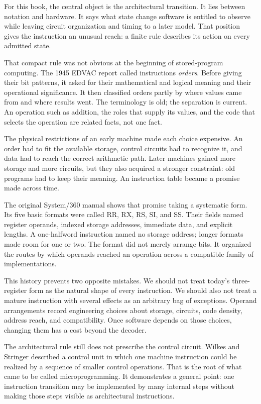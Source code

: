 For this book, the central object is the architectural transition. It lies
between notation and hardware. It says what state change software is entitled
to observe while leaving circuit organization and timing to a later model.
That position gives the instruction an unusual reach: a finite rule describes
its action on every admitted state.

That compact rule was not obvious at the beginning of stored-program
computing. The 1945 EDVAC report called instructions \emph{orders}. Before
giving their bit patterns, it asked for their mathematical and logical meaning
and their operational significance. It then classified orders partly by where
values came from and where results went. The terminology is old; the
separation is current. An operation such as addition, the roles that supply
its values, and the code that selects the operation are related facts, not one
fact. \autocite{vonneumann1945edvac}

The physical restrictions of an early machine made each choice expensive. An
order had to fit the available storage, control circuits had to recognize it,
and data had to reach the correct arithmetic path. Later machines gained more
storage and more circuits, but they also acquired a stronger constraint: old
programs had to keep their meaning. An instruction table became a promise made
across time.

The original System/360 manual shows that promise taking a systematic form.
Its five basic formats were called RR, RX, RS, SI, and SS. Their fields named
register operands, indexed storage addresses, immediate data, and explicit
lengths. A one-halfword instruction named no storage address; longer formats
made room for one or two. The format did not merely arrange bits. It organized
the routes by which operands reached an operation across a compatible family
of implementations. \autocite{ibm1964system360principles,amdahl1964system360}

This history prevents two opposite mistakes. We should not treat today's
three-register form as the natural shape of every instruction. We should also
not treat a mature instruction with several effects as an arbitrary bag of
exceptions. Operand arrangements record engineering choices about storage,
circuits, code density, address reach, and compatibility. Once software
depends on those choices, changing them has a cost beyond the decoder.

The architectural rule still does not prescribe the control circuit. Wilkes
and Stringer described a control unit in which one machine instruction could
be realized by a sequence of smaller control operations. That is the root of
what came to be called microprogramming. It demonstrates a general point: one
instruction transition may be implemented by many internal steps without
making those steps visible as architectural instructions.
\autocite{wilkes1953microprogramming}

